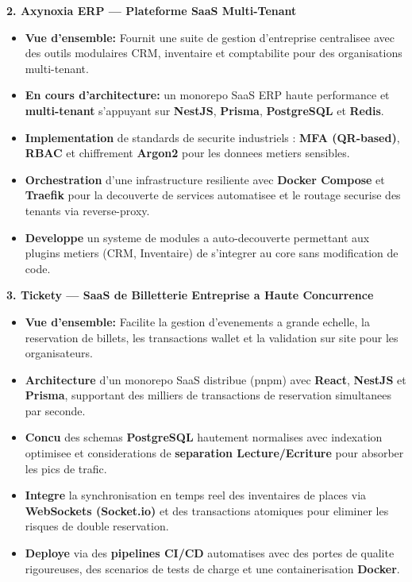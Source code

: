 \documentclass[10pt, letterpaper]{article}
\newenvironment{highlights}{
\begin{itemize}[leftmargin=12pt, itemsep=2pt]
}{
\end{itemize}
}
\begin{document}
\textbf{2. Axynoxia ERP --- Plateforme SaaS Multi-Tenant}
\begin{highlights}
\item \textbf{Vue d'ensemble:} Fournit une suite de gestion d'entreprise centralisee avec des outils modulaires CRM, inventaire et comptabilite pour des organisations multi-tenant.
\item \textbf{En cours d'architecture:} un monorepo SaaS ERP haute performance et \textbf{multi-tenant} s'appuyant sur \textbf{NestJS}, \textbf{Prisma}, \textbf{PostgreSQL} et \textbf{Redis}.
\item \textbf{Implementation} de standards de securite industriels : \textbf{MFA (QR-based)}, \textbf{RBAC} et chiffrement \textbf{Argon2} pour les donnees metiers sensibles.
\item \textbf{Orchestration} d'une infrastructure resiliente avec \textbf{Docker Compose} et \textbf{Traefik} pour la decouverte de services automatisee et le routage securise des tenants via reverse-proxy.
\item \textbf{Developpe} un systeme de modules a auto-decouverte permettant aux plugins metiers (CRM, Inventaire) de s'integrer au core sans modification de code.
\end{highlights}

\textbf{3. Tickety --- SaaS de Billetterie Entreprise a Haute Concurrence}
\begin{highlights}
\item \textbf{Vue d'ensemble:} Facilite la gestion d'evenements a grande echelle, la reservation de billets, les transactions wallet et la validation sur site pour les organisateurs.
\item \textbf{Architecture} d'un monorepo SaaS distribue (pnpm) avec \textbf{React}, \textbf{NestJS} et \textbf{Prisma}, supportant des milliers de transactions de reservation simultanees par seconde.
\item \textbf{Concu} des schemas \textbf{PostgreSQL} hautement normalises avec indexation optimisee et considerations de \textbf{separation Lecture/Ecriture} pour absorber les pics de trafic.
\item \textbf{Integre} la synchronisation en temps reel des inventaires de places via \textbf{WebSockets (Socket.io)} et des transactions atomiques pour eliminer les risques de double reservation.
\item \textbf{Deploye} via des \textbf{pipelines CI/CD} automatises avec des portes de qualite rigoureuses, des scenarios de tests de charge et une containerisation \textbf{Docker}.
\end{highlights}
\end{document}
